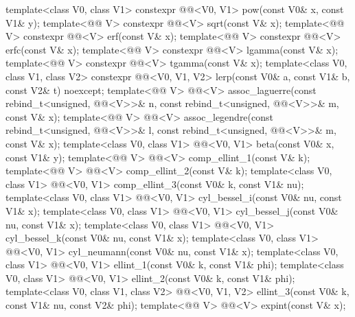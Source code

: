 \begin{itemdecl}
template<class V0, class V1>
  constexpr @@<V0, V1> pow(const V0& x, const V1& y);
template<@@ V> constexpr @@<V> sqrt(const V& x);
template<@@ V> constexpr @@<V> erf(const V& x);
template<@@ V> constexpr @@<V> erfc(const V& x);
template<@@ V> constexpr @@<V> lgamma(const V& x);
template<@@ V> constexpr @@<V> tgamma(const V& x);
template<class V0, class V1, class V2>
  constexpr @@<V0, V1, V2> lerp(const V0& a, const V1& b, const V2& t) noexcept;
template<@@ V>
  @@<V> assoc_laguerre(const rebind_t<unsigned, @@<V>>& n, const
    rebind_t<unsigned, @@<V>>& m,
                   const V& x);
template<@@ V>
  @@<V> assoc_legendre(const rebind_t<unsigned, @@<V>>& l, const
    rebind_t<unsigned, @@<V>>& m,
                   const V& x);
template<class V0, class V1>
  @@<V0, V1> beta(const V0& x, const V1& y);
template<@@ V> @@<V> comp_ellint_1(const V& k);
template<@@ V> @@<V> comp_ellint_2(const V& k);
template<class V0, class V1>
  @@<V0, V1> comp_ellint_3(const V0& k, const V1& nu);
template<class V0, class V1>
  @@<V0, V1> cyl_bessel_i(const V0& nu, const V1& x);
template<class V0, class V1>
  @@<V0, V1> cyl_bessel_j(const V0& nu, const V1& x);
template<class V0, class V1>
  @@<V0, V1> cyl_bessel_k(const V0& nu, const V1& x);
template<class V0, class V1>
  @@<V0, V1> cyl_neumann(const V0& nu, const V1& x);
template<class V0, class V1>
  @@<V0, V1> ellint_1(const V0& k, const V1& phi);
template<class V0, class V1>
  @@<V0, V1> ellint_2(const V0& k, const V1& phi);
template<class V0, class V1, class V2>
  @@<V0, V1, V2> ellint_3(const V0& k, const V1& nu, const V2& phi);
template<@@ V> @@<V> expint(const V& x);

\end{itemdecl}
